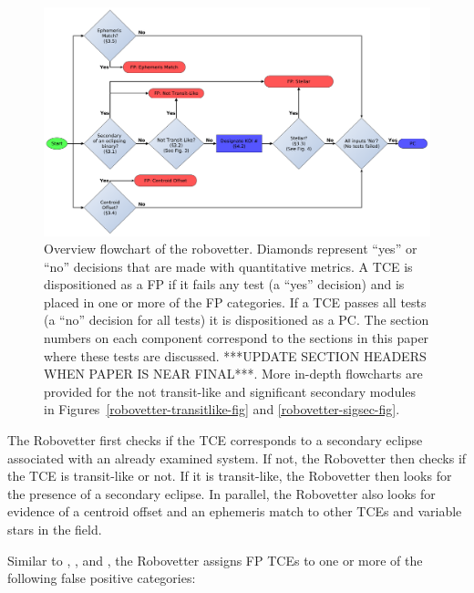 \begin{figure}[ht]
\centering
\includegraphics[width=\linewidth]{RoboVetter-Diagram-V4-Overview.pdf}
\caption{Overview flowchart of the robovetter. Diamonds represent ``yes'' or ``no'' decisions that are made with quantitative metrics. A TCE is dispositioned as a FP if it fails any test (a ``yes'' decision) and is placed in one or more of the FP categories. If a TCE passes all tests (a ``no'' decision for all tests) it is dispositioned as a PC. The section numbers on each component correspond to the sections in this paper where these tests are discussed. ***UPDATE SECTION HEADERS WHEN PAPER IS NEAR FINAL***. More in-depth flowcharts are provided for the not transit-like and significant secondary modules in Figures~\ref{robovetter-transitlike-fig} and \ref{robovetter-sigsec-fig}.}
\label{robovetter-overview-fig}
\end{figure}


The Robovetter first checks if the TCE corresponds to a secondary eclipse associated with an already examined system. If not, the Robovetter then checks if the TCE is transit-like or not. If it is transit-like, the Robovetter then looks for the presence of a secondary eclipse. In parallel, the Robovetter also looks for evidence of a centroid offset and an ephemeris match to other TCEs and variable stars in the \kepler{} field. 

\label{s:majorflags}
Similar to \citet{Rowe2015a}, \citep{Mullally2015cat}, and \citet{Coughlin2016}, the Robovetter assigns FP TCEs to one or more of the following false positive categories:


